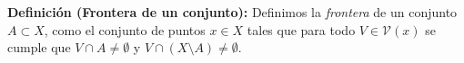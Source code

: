 



\textbf{Definición (Frontera de un conjunto):} Definimos la \textit{frontera} de un conjunto $A\subset X$, como el conjunto de puntos $x\in X$ tales que para todo $V\in\mathcal{V}(x)$ se cumple que $V\cap A\neq\emptyset$ y $V\cap(X\setminus A)\neq\emptyset$.
